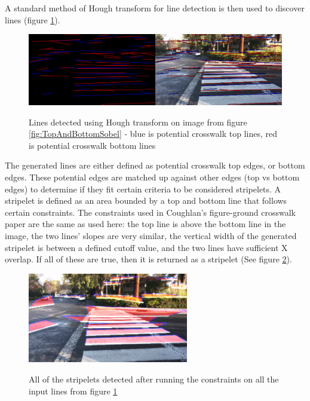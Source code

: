 \documentclass[12pt]{ucthesis}
\newcommand{\captionfonts}{\small\bf\ssp}
\begin{document}
A standard method of Hough transform for line detection is then used to discover lines (figure \ref{fig:HoughLinesAfterMerge}). 

\begin{figure}[h!]
\begin{center}
\includegraphics[width=14cm]{HoughLinesAfterMerge.png}
\captionfonts
\caption[Hough Line Transform Detection Result]{Lines detected using Hough transform on image from figure \ref{fig:TopAndBottomSobel} - blue is potential crosswalk top lines, red is potential crosswalk bottom lines}
\label{fig:HoughLinesAfterMerge}
\end{center}
\end{figure}

The generated lines are either defined as potential crosswalk top edges, or bottom edges. These potential edges are matched up against other edges (top vs bottom edges) to determine if they fit certain criteria to be considered stripelets. A stripelet is defined as an area bounded by a top and bottom line that follows certain constraints. The constraints used in Coughlan's figure-ground crosswalk paper \cite{Coughlan2006} are the same as used here: the top line is above the bottom line in the image, the two lines' slopes are very similar, the vertical width of the generated stripelet is between a defined cutoff value, and the two lines have sufficient X overlap. If all of these are true, then it is returned as a stripelet (See figure \ref{fig:UnculledStripelets}). 

\begin{figure}[h!]
\begin{center}
\includegraphics[width=7cm]{UnculledStripelets.png}
\captionfonts
\caption[All detected stripelets]{All of the stripelets detected after running the constraints on all the input lines from figure \ref{fig:HoughLinesAfterMerge}}
\label{fig:UnculledStripelets}
\end{center}
\end{figure}
\end{document}
